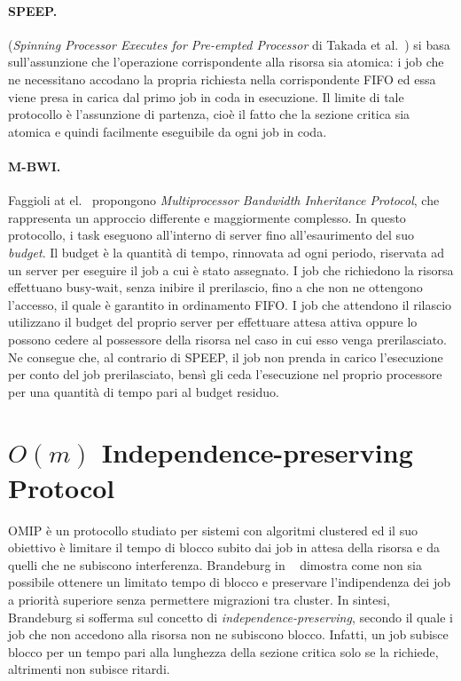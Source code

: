 \paragraph{SPEEP.} (\textit{Spinning Processor Executes for Pre-empted Processor} di Takada et al.~\cite{641276}) si basa sull'assunzione che l'operazione corrispondente alla risorsa sia atomica: i job che ne necessitano accodano la propria richiesta nella corrispondente FIFO ed essa viene presa in carica dal primo job in coda in esecuzione. Il limite di tale protocollo è l'assunzione di partenza, cioè il fatto che la sezione critica sia atomica e quindi facilmente eseguibile da ogni job in coda.\\

\paragraph{M-BWI.} Faggioli at el.~\cite{5562902} propongono \textit{Multiprocessor Bandwidth Inheritance Protocol}, che rappresenta un approccio differente e maggiormente complesso. In questo protocollo, i task eseguono all'interno di server fino all'esaurimento del suo \textit{budget}. Il budget è la quantità di tempo, rinnovata ad ogni periodo, riservata ad un server per eseguire il job a cui è stato assegnato. I job che richiedono la risorsa effettuano busy-wait, senza inibire il prerilascio, fino a che non ne ottengono l'accesso, il quale è garantito in ordinamento FIFO. I job che attendono il rilascio utilizzano il budget del proprio server per effettuare attesa attiva oppure lo possono cedere al possessore della risorsa nel caso in cui esso venga prerilasciato. Ne consegue che, al contrario di SPEEP, il job non prenda in carico l'esecuzione per conto del job prerilasciato, bensì gli ceda l'esecuzione nel proprio processore per una quantità di tempo pari al budget residuo.\\

\section{$O(m)$ Independence-preserving Protocol}
\label{sec:lockProtocols.omip}

OMIP è un protocollo studiato per sistemi con algoritmi clustered ed il suo obiettivo è limitare il tempo di blocco subito dai job in attesa della risorsa e da quelli che ne subiscono interferenza. Brandeburg in ~\cite{6602109} dimostra come non sia possibile ottenere un limitato tempo di blocco e preservare l’indipendenza dei job a priorità superiore senza permettere migrazioni tra cluster. In sintesi, Brandeburg si sofferma sul concetto di \textit{independence-preserving}, secondo il quale i job che non accedono alla risorsa non ne subiscono blocco. Infatti, un job subisce blocco per un tempo pari alla lunghezza della sezione critica solo se la richiede, altrimenti non subisce ritardi.\\

